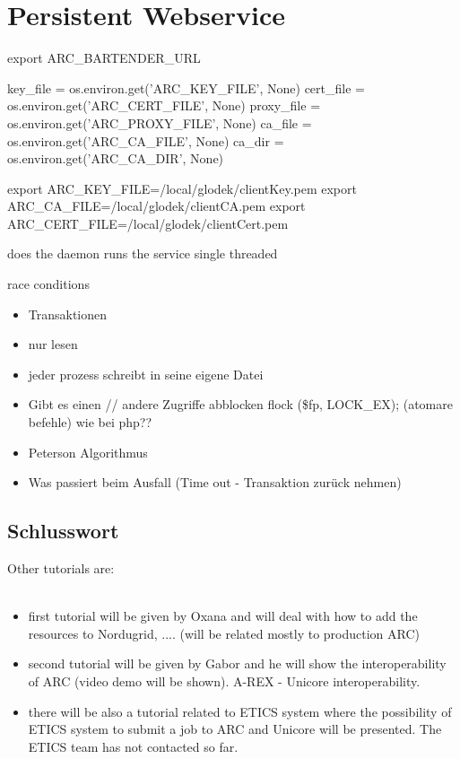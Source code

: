  
\chapter{Persistent Webservice}


export ARC\_BARTENDER\_URL


    key\_file = os.environ.get('ARC\_KEY\_FILE', None)
    cert\_file = os.environ.get('ARC\_CERT\_FILE', None)
    proxy\_file = os.environ.get('ARC\_PROXY\_FILE', None)
    ca\_file = os.environ.get('ARC\_CA\_FILE', None)
    ca\_dir = os.environ.get('ARC\_CA\_DIR', None)

export ARC\_KEY\_FILE=/local/glodek/clientKey.pem
export ARC\_CA\_FILE=/local/glodek/clientCA.pem
export ARC\_CERT\_FILE=/local/glodek/clientCert.pem

does the daemon runs the service single threaded

race conditions
\begin{itemize}
 \item Transaktionen
 \item nur lesen
 \item jeder prozess schreibt in seine eigene Datei
 \item Gibt es einen     // andere Zugriffe abblocken
    flock (\$fp, LOCK\_EX);  (atomare befehle)
 	wie bei php??
 \item Peterson Algorithmus
 \item Was passiert beim Ausfall (Time out - Transaktion zurück nehmen)
\end{itemize}



\section{Schlusswort}

Other tutorials are:\\
\\
\begin{itemize}
 \item first tutorial will be given by Oxana and will deal with how to add the 
resources to Nordugrid, .... (will be related mostly to production ARC)
 \item second tutorial will be given by Gabor and he will show the 
interoperability of ARC (video demo will be shown). A-REX - Unicore 
interoperability.
 \item there will be also a tutorial related to ETICS system where the 
possibility of ETICS system to submit a job to ARC and Unicore will be 
presented. The ETICS team has not contacted so far.
\end{itemize}





